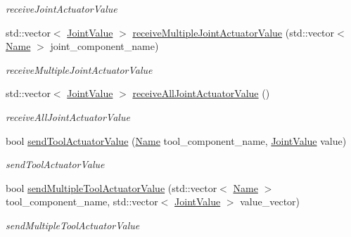 \begin{DoxyCompactItemize}
\begin{DoxyCompactList}\small\item\em receive\+Joint\+Actuator\+Value \end{DoxyCompactList}\item 
std\+::vector$<$ \hyperlink{namespacerobotis__manipulator_aa0556c98c5294ccf3a96c2d0fe315e40}{Joint\+Value} $>$ \hyperlink{classrobotis__manipulator_1_1_robotis_manipulator_a6affcbccc199ff5fadcf6b827d368c91}{receive\+Multiple\+Joint\+Actuator\+Value} (std\+::vector$<$ \hyperlink{namespacerobotis__manipulator_a08c2d25e77a01ad75b9bb740f8ce4765}{Name} $>$ joint\+\_\+component\+\_\+name)
\begin{DoxyCompactList}\small\item\em receive\+Multiple\+Joint\+Actuator\+Value \end{DoxyCompactList}\item 
std\+::vector$<$ \hyperlink{namespacerobotis__manipulator_aa0556c98c5294ccf3a96c2d0fe315e40}{Joint\+Value} $>$ \hyperlink{classrobotis__manipulator_1_1_robotis_manipulator_a445c7e5737940b0a560d715d587eadd5}{receive\+All\+Joint\+Actuator\+Value} ()
\begin{DoxyCompactList}\small\item\em receive\+All\+Joint\+Actuator\+Value \end{DoxyCompactList}\item 
bool \hyperlink{classrobotis__manipulator_1_1_robotis_manipulator_ac1a87db540f2b546ff39269beb842da8}{send\+Tool\+Actuator\+Value} (\hyperlink{namespacerobotis__manipulator_a08c2d25e77a01ad75b9bb740f8ce4765}{Name} tool\+\_\+component\+\_\+name, \hyperlink{namespacerobotis__manipulator_aa0556c98c5294ccf3a96c2d0fe315e40}{Joint\+Value} value)
\begin{DoxyCompactList}\small\item\em send\+Tool\+Actuator\+Value \end{DoxyCompactList}\item 
bool \hyperlink{classrobotis__manipulator_1_1_robotis_manipulator_a88530b0521cd337c44ba87723135ef9c}{send\+Multiple\+Tool\+Actuator\+Value} (std\+::vector$<$ \hyperlink{namespacerobotis__manipulator_a08c2d25e77a01ad75b9bb740f8ce4765}{Name} $>$ tool\+\_\+component\+\_\+name, std\+::vector$<$ \hyperlink{namespacerobotis__manipulator_aa0556c98c5294ccf3a96c2d0fe315e40}{Joint\+Value} $>$ value\+\_\+vector)
\begin{DoxyCompactList}\small\item\em send\+Multiple\+Tool\+Actuator\+Value \end{DoxyCompactList}\item 

\end{DoxyCompactItemize}
